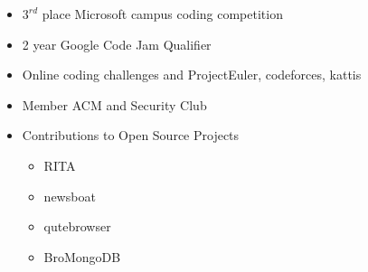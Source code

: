 \documentclass[11pt]{article}
\begin{document}
\begin{multicols}{2}
\begin{itemize}
	\item $3^{rd}$ place Microsoft campus coding competition
	\item 2 year Google Code Jam Qualifier
	\item Online coding challenges and ProjectEuler, codeforces, kattis
	\item Member ACM and Security Club
	\item Contributions to Open Source Projects
\begin{multicols}{2}
	\begin{itemize} 
		\item RITA 
		\item newsboat 
		\item qutebrowser 
		\item BroMongoDB 
	\end{itemize}
\end{multicols}
\end{itemize}
\end{multicols}
\end{document}
